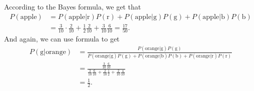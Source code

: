 
According to the Bayes formula, we get that 
\begin{align*}
P\left(\text{apple}\right) & =P\left(\text{apple}\vert\text{r}\right)P\left(\text{r}\right)+P\left(\text{apple}\vert\text{g}\right)P\left(\text{g}\right)+P\left(\text{apple}\vert\text{b}\right)P\left(\text{b}\right)\\
 & =\frac{3}{10}\cdot\frac{2}{10}+\frac{1}{2}\frac{2}{10}+\frac{3}{10}\frac{6}{10}=\frac{17}{50}.
\end{align*}
And again, we can use formula to get 
\begin{align*}
P\left(\text{g}\vert\text{orange}\right) & =\frac{P\left(\text{orange}\vert\text{g}\right)P\left(\text{g}\right)}{P\left(\text{orange}\vert\text{g}\right)P\left(\text{g}\right)+P\left(\text{orange}\vert\text{b}\right)P\left(\text{b}\right)+P\left(\text{orange}\vert\text{r}\right)P\left(\text{r}\right)}\\
 & =\frac{\frac{3}{10}\frac{6}{10}}{\frac{3}{10}\frac{6}{10}+\frac{2}{10}\frac{1}{2}+\frac{2}{10}\frac{4}{10}}\\
 & =\frac{1}{2}.
\end{align*}
 
